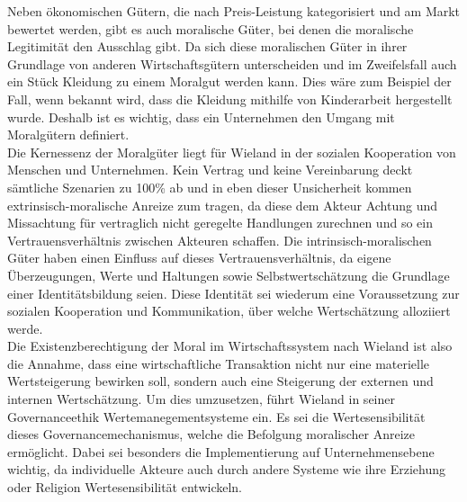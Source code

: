 \documentclass[12pt]{article}
\begin{document}
\FloatBarrier
\noindent Neben ökonomischen Gütern, die nach Preis-Leistung kategorisiert und am Markt bewertet werden, gibt es auch moralische Güter, bei denen die moralische Legitimität den Ausschlag gibt. Da sich diese moralischen Güter in ihrer Grundlage von anderen Wirtschaftsgütern unterscheiden und im Zweifelsfall auch ein Stück Kleidung zu einem Moralgut werden kann. Dies wäre zum Beispiel der Fall, wenn bekannt wird, dass die Kleidung mithilfe von Kinderarbeit hergestellt wurde. Deshalb ist es wichtig, dass ein Unternehmen den Umgang mit Moralgütern definiert.\\[10pt]
Die Kernessenz der Moralgüter liegt für Wieland in der sozialen Kooperation von Menschen und Unternehmen. Kein Vertrag und keine Vereinbarung deckt sämtliche Szenarien zu 100\% ab und in eben dieser Unsicherheit kommen extrinsisch-moralische Anreize zum tragen, da diese dem Akteur Achtung und Missachtung für vertraglich nicht geregelte Handlungen zurechnen und so ein Vertrauensverhältnis zwischen Akteuren schaffen. Die intrinsisch-moralischen Güter haben einen Einfluss auf dieses Vertrauensverhältnis, da eigene Überzeugungen, Werte und Haltungen sowie Selbstwertschätzung die Grundlage einer Identitätsbildung seien. Diese Identität sei wiederum eine Voraussetzung zur sozialen Kooperation und Kommunikation, über welche Wertschätzung alloziiert werde.\\[10pt]
Die Existenzberechtigung der Moral im Wirtschaftssystem nach Wieland ist also die Annahme, dass eine wirtschaftliche Transaktion nicht nur eine materielle Wertsteigerung bewirken soll, sondern auch eine Steigerung der externen und internen Wertschätzung. Um dies umzusetzen, führt Wieland in seiner Governanceethik Wertemanegementsysteme ein. Es sei die Wertesensibilität dieses Governancemechanismus, welche die Befolgung moralischer Anreize ermöglicht. Dabei sei besonders die Implementierung auf Unternehmensebene wichtig, da individuelle Akteure auch durch andere Systeme wie ihre Erziehung oder Religion Wertesensibilität entwickeln.
\end{document}
